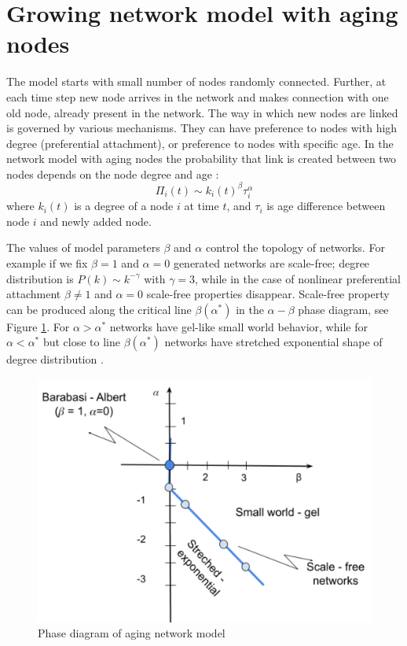 \section{Growing network model with aging nodes}

The model starts with small number of nodes randomly connected. Further, at each time step new node arrives in the network and makes connection with one old node, already present in the network.
The way in which new nodes are linked is governed by various mechanisms. They can have preference to nodes with high degree (preferential attachment), or preference to nodes with specific age. In the network model with aging nodes the probability that link is created between two nodes depends on the node degree and age \cite{hajra2004}:
\begin{equation}
\Pi_{i}(t)\sim k_{i}(t)^{\beta}\tau_{i}^{\alpha} 
\label{eq:1}
\end{equation}
where $k_{i}(t)$ is a degree of a node $i$ at time $t$, and $\tau_{i}$ is age difference between node $i$ and newly added node. 

The values of model parameters $\beta$ and $\alpha$ control the topology of networks.  For example if we fix $\beta=1$ and $\alpha=0$ generated networks are scale-free; degree distribution is $P(k) \sim k^{-\gamma}$ with $\gamma=3$, while in the case of nonlinear preferential attachment $\beta \neq 1$ and $\alpha=0$ scale-free properties disappear. Scale-free property can be produced along the critical line $\beta(\alpha^{*})$ in the $\alpha-\beta$ phase diagram, see Figure \ref{fig:diagram}. For $\alpha>\alpha^{*}$ networks have gel-like small world behavior, while for $\alpha<\alpha^{*}$ but close to line $\beta(\alpha^{*})$ networks have stretched exponential shape of degree distribution \cite{hajra2004}.  

\begin{figure}[!ht]
	\centering
	\includegraphics[width=0.5\linewidth]{Figures/diagram.png}
	\caption{Phase diagram of aging network model}
	\label{fig:diagram}
\end{figure}


